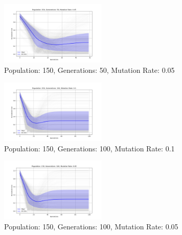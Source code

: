 \documentclass[
]{article}
\begin{document}
    \begin{figure}[H]
        \centering
        \includegraphics[width=0.45\textwidth]{genetic_algorithm/appendix/Population_150_Generations_50_MutationRate_0.05}
        \caption{Population: 150, Generations: 50, Mutation Rate: 0.05}
        \label{fig:app_ga_150_50_05}
    \end{figure}

    \begin{figure}[H]
        \centering
        \includegraphics[width=0.45\textwidth]{genetic_algorithm/appendix/Population_150_Generations_100_MutationRate_0.1}
        \caption{Population: 150, Generations: 100, Mutation Rate: 0.1}
        \label{fig:app_ga_150_100_1}
    \end{figure}

    \begin{figure}[H]
        \centering
        \includegraphics[width=0.45\textwidth]{genetic_algorithm/appendix/Population_150_Generations_100_MutationRate_0.05}
        \caption{Population: 150, Generations: 100, Mutation Rate: 0.05}
        \label{fig:app_ga_150_100_05}
    \end{figure}
\end{document}
